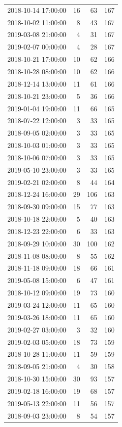 \begin{tabular}{lrrr}
2018-10-14 17:00:00 & 16 & 63 & 167 \\
2018-10-02 11:00:00 & 8 & 43 & 167 \\
2019-03-08 21:00:00 & 4 & 31 & 167 \\
2019-02-07 00:00:00 & 4 & 28 & 167 \\
2018-10-21 17:00:00 & 10 & 62 & 166 \\
2018-10-28 08:00:00 & 10 & 62 & 166 \\
2018-12-14 13:00:00 & 11 & 61 & 166 \\
2018-10-21 23:00:00 & 5 & 36 & 166 \\
2019-01-04 19:00:00 & 11 & 66 & 165 \\
2018-07-22 12:00:00 & 3 & 33 & 165 \\
2018-09-05 02:00:00 & 3 & 33 & 165 \\
2018-10-03 01:00:00 & 3 & 33 & 165 \\
2018-10-06 07:00:00 & 3 & 33 & 165 \\
2019-05-10 23:00:00 & 3 & 33 & 165 \\
2019-02-21 02:00:00 & 8 & 44 & 164 \\
2018-12-24 16:00:00 & 29 & 106 & 163 \\
2018-09-30 09:00:00 & 15 & 77 & 163 \\
2018-10-18 22:00:00 & 5 & 40 & 163 \\
2018-12-23 22:00:00 & 6 & 33 & 163 \\
2018-09-29 10:00:00 & 30 & 100 & 162 \\
2018-11-08 08:00:00 & 8 & 55 & 162 \\
2018-11-18 09:00:00 & 18 & 66 & 161 \\
2019-05-08 15:00:00 & 6 & 47 & 161 \\
2018-10-12 09:00:00 & 19 & 73 & 160 \\
2019-03-24 12:00:00 & 11 & 65 & 160 \\
2019-03-26 18:00:00 & 11 & 65 & 160 \\
2019-02-27 03:00:00 & 3 & 32 & 160 \\
2019-02-03 05:00:00 & 18 & 73 & 159 \\
2018-10-28 11:00:00 & 11 & 59 & 159 \\
2018-09-05 21:00:00 & 4 & 30 & 158 \\
2018-10-30 15:00:00 & 30 & 93 & 157 \\
2019-02-18 16:00:00 & 19 & 68 & 157 \\
2019-05-13 22:00:00 & 11 & 56 & 157 \\
2018-09-03 23:00:00 & 8 & 54 & 157 \\

\end{tabular}
